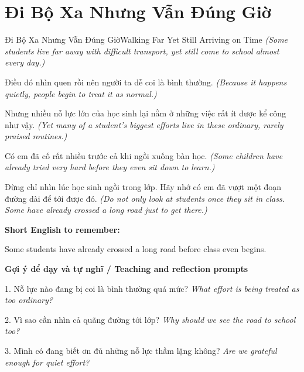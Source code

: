 \section{Đi Bộ Xa Nhưng Vẫn Đúng Giờ}
\begin{truyen}{Đi Bộ Xa Nhưng Vẫn Đúng Giờ}{Walking Far Yet Still Arriving on Time}
\textit{(Some students live far away with difficult transport, yet still come to school almost every day.)}

Điều đó nhìn quen rồi nên người ta dễ coi là bình thường.
\textit{(Because it happens quietly, people begin to treat it as normal.)}

Nhưng nhiều nỗ lực lớn của học sinh lại nằm ở những việc rất ít được kể công như vậy.
\textit{(Yet many of a student’s biggest efforts live in these ordinary, rarely praised routines.)}

Có em đã cố rất nhiều trước cả khi ngồi xuống bàn học.
\textit{(Some children have already tried very hard before they even sit down to learn.)}

\end{truyen}

\begin{baihoc}
Đừng chỉ nhìn lúc học sinh ngồi trong lớp. Hãy nhớ có em đã vượt một đoạn đường dài để tới được đó.
\textit{(Do not only look at students once they sit in class. Some have already crossed a long road just to get there.)}
\end{baihoc}

\begin{ghinhoanh}
\textbf{Short English to remember:}

Some students have already crossed a long road before class even begins.

\end{ghinhoanh}

\begin{tuhocnhanh}
\textbf{Gợi ý để dạy và tự nghĩ / Teaching and reflection prompts}

1. Nỗ lực nào đang bị coi là bình thường quá mức? \textit{What effort is being treated as too ordinary?}

2. Vì sao cần nhìn cả quãng đường tới lớp? \textit{Why should we see the road to school too?}

3. Mình có đang biết ơn đủ những nỗ lực thầm lặng không? \textit{Are we grateful enough for quiet effort?}
\end{tuhocnhanh}
\ngancach

